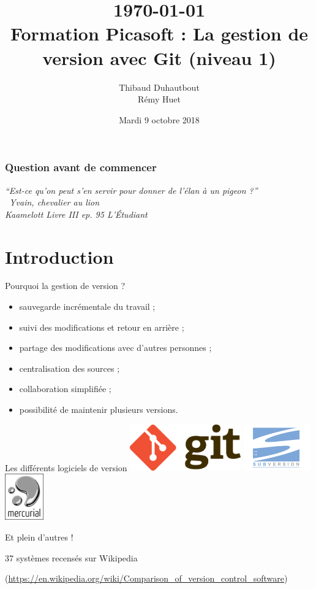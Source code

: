 \documentclass[usepdftitle=false]{beamer}
\title[Formation Git\_v1]{\today \\ Formation Picasoft : La gestion de version avec Git (niveau 1)}
\author[T. Duhautbout - R. Huet]{Thibaud {\sc Duhautbout} \\ Rémy {\sc Huet}}
\institute[Picasoft]{Association Picasoft}
\date[09/10/2018]{Mardi 9 octobre 2018}
\begin{document}
\begin{frame}
	\titlepage
\end{frame}

\begin{frame}
	\frametitle{Question avant de commencer}
	\begin{flushright}
		{\it\enquote{Est-ce qu'on peut s'en servir pour donner de l'élan à un pigeon ?} \\ Yvain, chevalier au lion \\ Kaamelott Livre III ep. 95 L'Étudiant}
	\end{flushright}
\end{frame}

\section{Introduction}

\begin{frame}{Pourquoi la gestion de version ?}

\begin{itemize}
\item sauvegarde incrémentale du travail ;
\item suivi des modifications et retour en arrière ;
\item partage des modifications avec d'autres personnes ;
\item centralisation des sources ;
\item collaboration simplifiée ;
\item possibilité de maintenir plusieurs versions.
\end{itemize}
\end{frame}

\begin{frame}{Les différents logiciels de version}
\includegraphics[height=2cm]{./imgs/logo_git.png}
\hfill
\includegraphics[height=2cm]{./imgs/logo_svn.png}
\hfill
\includegraphics[height=2cm]{./imgs/logo_mercurial.png}

\bigskip

\centering
Et plein d'autres !

37 systèmes recensés sur Wikipedia

(\url{https://en.wikipedia.org/wiki/Comparison_of_version_control_software})
\end{frame}
\end{document}

